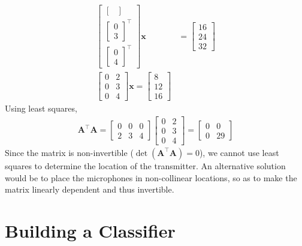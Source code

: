 \documentclass[]{article}
\newcommand{\tpose}[1]{#1^{\! \top} \!}
\begin{document}
\begin{align}
\begin{bmatrix}
{\begin{bmatrix}
		\end{bmatrix}} \\
	\tpose{\begin{bmatrix}
		0 \\
		3
		\end{bmatrix}} \\
	\tpose{\begin{bmatrix}
		0 \\
		4
		\end{bmatrix}}
	\end{bmatrix} \bm{x}
	&=
	\begin{bmatrix}
	16 \\
	24 \\
	32
	\end{bmatrix} \\
	\begin{bmatrix}
	0 & 2 \\
	0 & 3 \\
	0 & 4
	\end{bmatrix} \bm{x}
	=
	\begin{bmatrix}
	8 \\
	12 \\
	16
	\end{bmatrix}
\end{align}
Using least squares,
\begin{align}
	\tpose{\bm{A}} \bm{A} = 
	\begin{bmatrix}
	0 & 0 & 0 \\
	2 & 3 & 4
	\end{bmatrix}
	\begin{bmatrix}
	0 & 2 \\
	0 & 3 \\
	0 & 4
	\end{bmatrix}
	=
	\begin{bmatrix}
	0 & 0 \\
	0 & 29
	\end{bmatrix}
\end{align}
Since the matrix is non-invertible (\(\det(\tpose{\bm{A}} \bm{A}) = 0\)), we cannot use least squares to determine the location of the transmitter.
An alternative solution would be to place the microphones in non-collinear locations, so as to make the matrix linearly dependent and thus invertible.

\section{Building a Classifier}

\subsection{}
\end{document}
